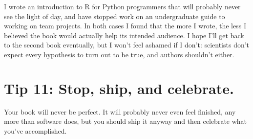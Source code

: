\documentclass[10pt,letterpaper]{article}
\begin{document}
I wrote an introduction to R for Python programmers that will probably never see the light of day,
and have stopped work on an undergraduate guide to working on team projects.
In both cases I found that the more I wrote,
the less I believed the book would actually help its intended audience.
I hope I'll get back to the second book eventually,
but I won't feel ashamed if I don't:
scientists don't expect every hypothesis to turn out to be true,
and authors shouldn't either.

\section*{Tip 11: Stop, ship, and celebrate.}

Your book will never be perfect.
It will probably never even feel finished,
any more than software does,
but you should ship it anyway
and then celebrate what you've accomplished.



\end{document}
